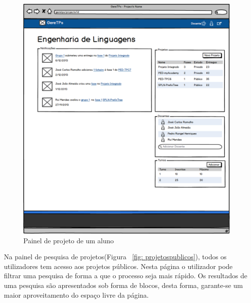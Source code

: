 \begin{figure}[htbp]
        \centering
        \includegraphics[width=1\textwidth]{images/prototipos/mockups/cursodocente.png}
         \caption{Painel de projeto de um aluno}
         \label{fig: cursodocente}
\end{figure}

Na painel de pesquisa de projetos(Figura ~\ref{fig: projetospublicos}), todos os utilizadores tem acesso aos projetos públicos. Nesta página o utilizador pode filtrar uma pesquisa de forma a que o processo seja mais rápido. Os resultados de uma pesquisa são apresentados sob forma de blocos, desta forma, garante-se um maior aproveitamento do espaço livre da página.\\

